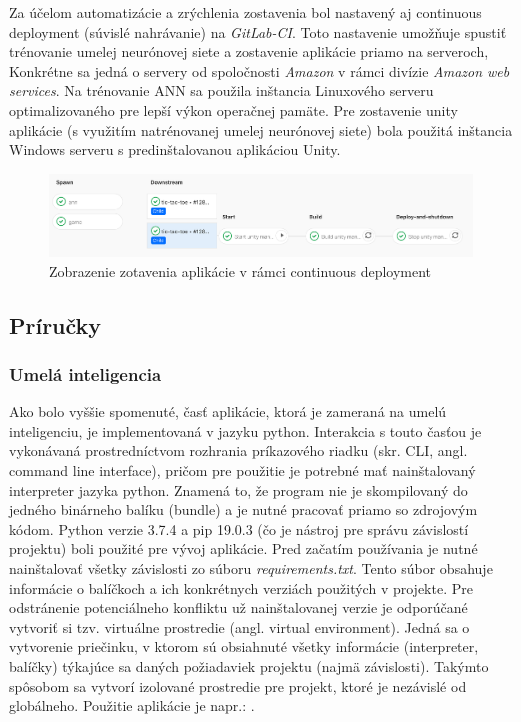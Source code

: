 Za účelom automatizácie a zrýchlenia zostavenia bol nastavený aj continuous deployment (súvislé nahrávanie) na
\emph{GitLab-CI}.
Toto nastavenie umožňuje spustiť trénovanie umelej neurónovej siete a zostavenie aplikácie priamo na serveroch,
Konkrétne sa jedná o servery od spoločnosti \emph{Amazon} v rámci divízie \emph{Amazon web services}.
Na trénovanie ANN sa použila inštancia Linuxového serveru optimalizovaného pre lepší výkon operačnej pamäte.
Pre zostavenie unity aplikácie (s využitím natrénovanej umelej neurónovej siete) bola použitá inštancia Windows
serveru s predinštalovanou aplikáciou Unity.
\begin{figure}[H]
    \centering
    \includegraphics[width=1\textwidth]{images/impl-cd.png}
    \caption{Zobrazenie zotavenia aplikácie v rámci continuous deployment}
\end{figure}\label{figure:cd}

\subsection{Príručky}\label{subsec:helpers}
\subsubsection{Umelá inteligencia}
Ako bolo vyššie spomenuté, časť aplikácie, ktorá je zameraná na umelú inteligenciu, je implementovaná v jazyku python.
Interakcia s touto časťou je vykonávaná prostredníctvom rozhrania príkazového riadku (skr. CLI, angl. command line
interface), pričom pre použitie je potrebné mať nainštalovaný interpreter jazyka python.
Znamená to, že program nie je skompilovaný do jedného binárneho balíku (bundle) a je nutné pracovať priamo so zdrojovým
kódom.
Python verzie 3.7.4 a pip 19.0.3 (čo je nástroj pre správu závislostí projektu) boli použité pre vývoj aplikácie.
Pred začatím používania je nutné nainštalovať všetky závislosti zo súboru \emph{requirements.txt}.
Tento súbor obsahuje informácie o balíčkoch a ich konkrétnych verziách použitých v projekte.
Pre odstránenie potenciálneho konfliktu už nainštalovanej verzie je odporúčané vytvoriť si tzv. virtuálne prostredie
(angl. virtual environment).
Jedná sa o vytvorenie priečinku, v ktorom sú obsiahnuté všetky informácie (interpreter, balíčky) týkajúce sa daných
požiadaviek projektu (najmä závislosti).
Takýmto spôsobom sa vytvorí izolované prostredie pre projekt, ktoré je nezávislé od globálneho.
Použitie aplikácie je napr.: .

